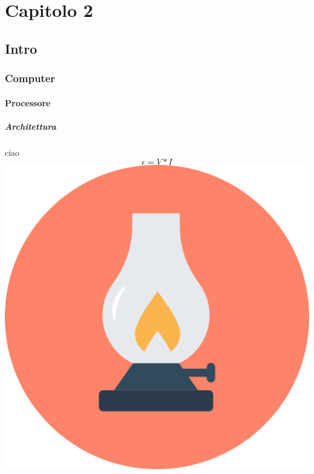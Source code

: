 \newpage
\section{Capitolo 2}
\subsection{Intro}
\subsubsection{Computer}
\paragraph{Processore}
\subparagraph{Architettura}
ciao $$ \epsilon = V * I $$
\includegraphics[scale=0.5]{Immagini/icon.png}

